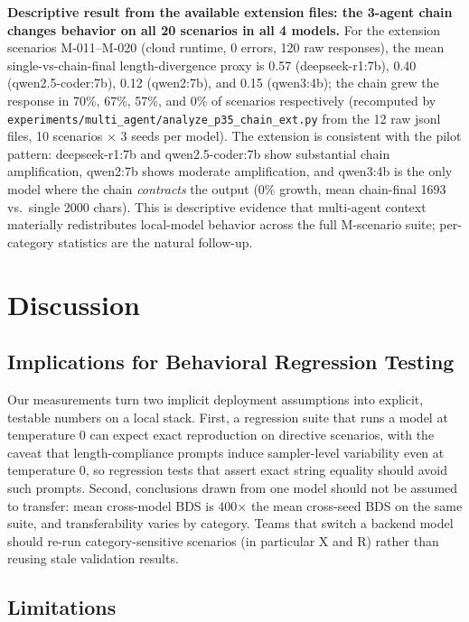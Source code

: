 \documentclass[11pt]{article}
\begin{document}
\textbf{Descriptive result from the available extension files: the 3-agent
chain changes behavior on all 20 scenarios in all 4 models.} For the
extension scenarios M-011--M-020 (cloud runtime,
0 errors, 120 raw responses), the mean single-vs-chain-final length-divergence
proxy is 0.57 (deepseek-r1:7b), 0.40 (qwen2.5-coder:7b), 0.12 (qwen2:7b),
and 0.15 (qwen3:4b); the chain grew the response in 70\%, 67\%, 57\%, and
0\% of scenarios respectively (recomputed by
\texttt{experiments/multi\_agent/analyze\_p35\_chain\_ext.py} from the 12
raw jsonl files, 10 scenarios $\times$ 3 seeds per model). The extension
is consistent with the pilot pattern: deepseek-r1:7b and qwen2.5-coder:7b show
substantial chain amplification, qwen2:7b shows moderate amplification, and
qwen3:4b is the only model where the chain \emph{contracts} the output
(0\% growth, mean chain-final 1693 vs.\ single 2000 chars). This is
descriptive evidence that multi-agent context materially redistributes
local-model behavior across the full \textsc{M}-scenario suite; per-category
statistics are the natural follow-up.

\section{Discussion}
\label{sec:discussion}

\subsection{Implications for Behavioral Regression Testing}

Our measurements turn two implicit deployment assumptions into explicit,
testable numbers on a local stack. First, a regression suite that runs a
model at temperature 0 can expect exact reproduction on directive
scenarios, with the caveat that length-compliance prompts induce
sampler-level variability even at temperature 0, so regression tests that
assert exact string equality should avoid such prompts. Second, conclusions
drawn from one model should not be assumed to transfer: mean cross-model
BDS is 400$\times$ the mean cross-seed BDS on the same suite, and
transferability varies by category. Teams that switch a backend model
should re-run category-sensitive scenarios (in particular \textsc{X} and
\textsc{R}) rather than reusing stale validation results.

\subsection{Limitations}
\end{document}
